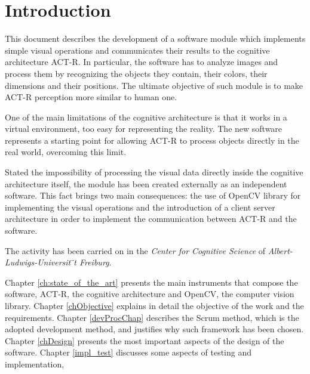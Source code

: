 \chapter{Introduction}
	This document describes the development of a software module which implements simple visual operations and communicates their results to the cognitive architecture \mbox{ACT-R}.
	In particular, the software has to analyze images and process them by recognizing the objects they contain, their colors, their dimensions and their positions.
	The ultimate objective of such module is to make \mbox{ACT-R} perception more similar to human one.
	
	One of the main limitations of the cognitive architecture is that it works in a virtual environment, too easy for representing the reality. 
	The new software represents a starting point for allowing \mbox{ACT-R} to process objects directly in the real world, overcoming this limit.
	
	Stated the impossibility of processing the visual data directly inside the cognitive architecture itself, the module has been created externally as an independent software.
	This fact brings two main consequences: the use of OpenCV library for implementing the visual operations and the introduction of a client server architecture in order to implement the communication between \mbox{ACT-R} and the software.

	The activity has been carried on in the \emph{Center for Cognitive Science} of \emph{Albert-Ludwigs-Universit ̈t Freiburg}. 

	Chapter \ref{ch:state_of_the_art} presents the main instruments that compose the software, \mbox{ACT-R}, the cognitive architecture and \mbox{OpenCV}, the computer vision library.
	Chapter \ref{chObjective} explains in detail the objective of the work and the requirements.
	Chapter \ref{devProcChap} describes the Scrum method, which is the adopted development method, and justifies why such framework has been chosen.
	Chapter \ref{chDesign} presents the most important aspects of the design of the software.
	Chapter \ref{impl_test} discusses some aspects of testing and implementation, 


 	
	
